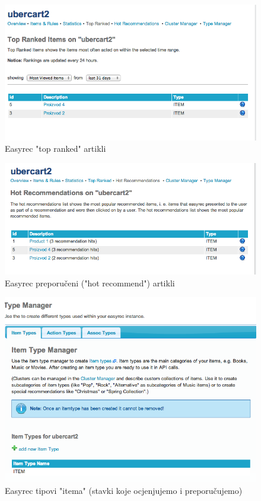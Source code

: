 \documentclass[times, utf8, seminar]{fit}
\begin{document}
{{{\begin{figure}[H]
\centering
\includegraphics[width=12cm]{img/easyrec_4_top_ranked.png}
\caption{Easyrec "top ranked" artikli}
\end{figure}


\begin{figure}[H]
\centering
\includegraphics[width=12cm]{img/easyrec_5_hot_recommend.png}
\caption{Easyrec preporučeni ("hot recommend") artikli}
\end{figure}

\begin{figure}[H]
\centering
\includegraphics[width=12cm]{img/easyrec_6_item_types.png}
\caption{Easyrec tipovi "itema" (stavki koje ocjenjujemo i preporučujemo) }
\end{figure}

}}}
\end{document}
